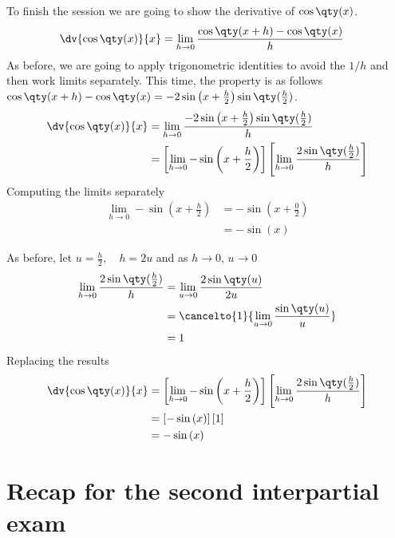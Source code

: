 \documentclass[../main-notes.tex]{subfile}
\begin{document}
To finish the session we are going to show the derivative of \(\cos\qty(x)\).
\begin{align*}
    \dv{\cos\qty(x)}{x} &= \lim_{h\to 0}\frac{\cos\qty(x+h) - \cos\qty(x)}{h} 
\end{align*}
As before, we are going to apply trigonometric identities to avoid the $1/h$ and then work limits separately.
This time, the property is as follows \(\cos\qty(x+h) - \cos\qty(x) = -2\sin\left(x+\frac{h}{2}\right)\sin\qty(\frac{h}{2})\).
\begin{align*}
    \dv{\cos\qty(x)}{x} &= \lim_{h\to 0}\frac{-2\sin\left(x+\frac{h}{2}\right)\sin\qty(\frac{h}{2})}{h} \\
                        &= \left[\lim_{h\to 0}-\sin\left(x+\frac{h}{2}\right)\right]\left[\lim_{h\to 0}\frac{2\sin\qty(\frac{h}{2})}{h}\right]
\end{align*}
Computing the limits separately
\begin{align*}
    \lim_{h\to 0}-\sin\left(x+\frac{h}{2}\right) &=-\sin\left(x+\frac{0}{2}\right) \\
                                                 &=-\sin\left(x\right) 
\end{align*}

As before, let \(u=\frac{h}{2},\quad h=2u\) and as $h\to0$, $u\to0$
\begin{align*}
    \lim_{h\to 0}\frac{2\sin\qty(\frac{h}{2})}{h} &= \lim_{u\to 0}\frac{2\sin\qty(u)}{2u} \\
                                                  &= \cancelto{1}{\lim_{u\to 0}\frac{\sin\qty(u)}{u}} \\
                                                  &= 1
\end{align*}
Replacing the results
\begin{align*}
    \dv{\cos\qty(x)}{x} &= \left[\lim_{h\to 0}-\sin\left(x+\frac{h}{2}\right)\right]\left[\lim_{h\to 0}\frac{2\sin\qty(\frac{h}{2})}{h}\right] \\
                        &= \left[-\sin\left(x\right)\right]\left[1\right] \\
                        &= -\sin\left(x\right)
\end{align*}

\newpage

\section{Recap for the second interpartial exam}
\end{document}
